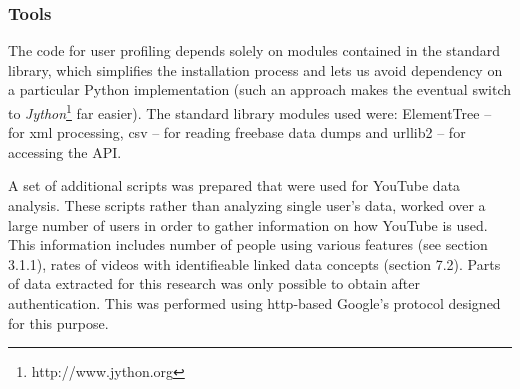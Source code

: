 \subsubsection{Tools}

The code for user profiling depends solely on modules contained in the standard
library, which simplifies the installation process and lets us avoid dependency
on a particular Python implementation (such an approach makes the eventual
switch to \textit{Jython}\footnote{http://www.jython.org} far easier). The
standard library modules used were: ElementTree -- for xml processing, csv --
for reading freebase data dumps and urllib2 -- for accessing the API.

A set of additional scripts was prepared that were used for YouTube data
analysis. These scripts rather than analyzing single user's data, worked over a
large number of users in order to gather information on how YouTube is used.
This information includes number of people using various features (see section
3.1.1), rates of videos with identifieable linked data concepts (section 7.2).
Parts of data extracted for this research was only possible to obtain after
authentication. This was performed using http-based Google's protocol designed
for this purpose.
